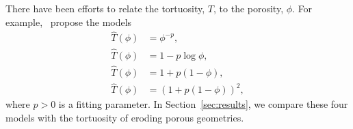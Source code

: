 \documentclass{jfm}
\begin{document}
There have been efforts to relate the tortuosity, $T$, to the porosity,
$\phi$.  For example,~\citet{mat-kha-koz2008} propose the
models
\begin{subequations}
  \label{eqn:tortuosityModels}
  \begin{align}
    \widehat{T}(\phi) &= \phi^{-p}, \\
    \widehat{T}(\phi) &= 1-p \log \phi, \\
    \widehat{T}(\phi) &= 1+p (1-\phi), \\
    \widehat{T}(\phi) &= (1+p (1-\phi))^2, 
  \end{align}
\end{subequations}
where $p>0$ is a fitting parameter.  In Section~\ref{sec:results}, we
compare these four models with the tortuosity of eroding porous
geometries.

\end{document}
